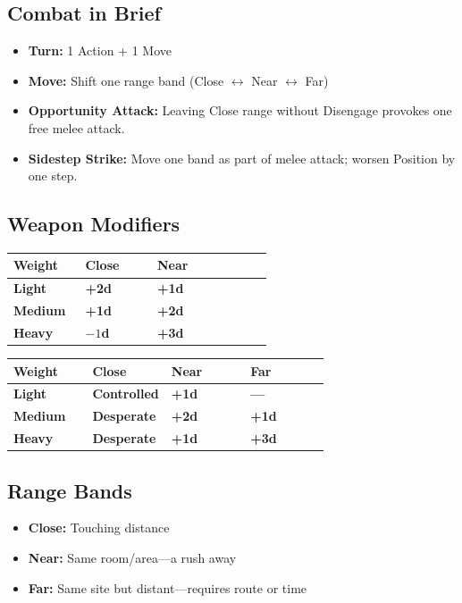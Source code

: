 \documentclass[10pt,twocolumn]{article} %
\begin{document}
\subsection{Combat in Brief}
\begin{itemize}[leftmargin=*]
    \item \textbf{Turn:} 1 Action + 1 Move
    \item \textbf{Move:} Shift one range band (Close $\leftrightarrow$ Near $\leftrightarrow$ Far)
    \item \textbf{Opportunity Attack:} Leaving Close range without Disengage provokes one free melee attack.
    \item \textbf{Sidestep Strike:} Move one band as part of melee attack; worsen Position by one step.
\end{itemize}

\subsection{Weapon Modifiers}
\begin{coretable}
\begin{tabular}{>{\bfseries}p{0.25\linewidth} >{\bfseries}p{0.25\linewidth} >{\bfseries}p{0.4\linewidth}}
\toprule
\textbf{Weight} & \textbf{Close} & \textbf{Near} \\
\midrule
Light & +2d & +1d \\
Medium & +1d & +2d \\
Heavy & $-1$d & +3d \\
\bottomrule
\end{tabular}
\end{coretable}

\begin{coretable}
\begin{tabular}{>{\bfseries}p{0.25\linewidth} >{\bfseries}p{0.25\linewidth} >{\bfseries}p{0.25\linewidth} >{\bfseries}p{0.25\linewidth}}
\toprule
\textbf{Weight} & \textbf{Close} & \textbf{Near} & \textbf{Far} \\
\midrule
Light & Controlled & +1d & — \\
Medium & Desperate & +2d & +1d \\
Heavy & Desperate & +1d & +3d \\
\bottomrule
\end{tabular}
\end{coretable}

\subsection{Range Bands}
\begin{itemize}[leftmargin=*]
    \item \textbf{Close:} Touching distance
    \item \textbf{Near:} Same room/area—a rush away
    \item \textbf{Far:} Same site but distant—requires route or time
\end{itemize}
\end{document}
